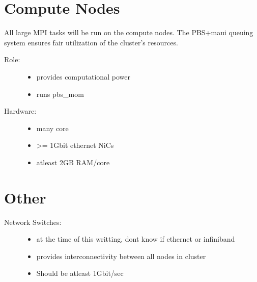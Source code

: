 \documentclass[letterpaper,10pt,english]{sphinxmanual}
\begin{document}
\section{Compute Nodes}
\label{setup:compute-nodes}
All large MPI tasks will be run on the compute nodes.  The PBS+maui queuing
system ensures fair utilization of the cluster's resources.
\begin{description}
\item[{Role:}] \leavevmode\begin{itemize}
\item {} 
provides computational power

\item {} 
runs pbs\_mom

\end{itemize}

\item[{Hardware:}] \leavevmode\begin{itemize}
\item {} 
many core

\item {} 
\textgreater{}= 1Gbit ethernet NiCs

\item {} 
atleast 2GB RAM/core

\end{itemize}

\end{description}


\section{Other}
\label{setup:other}\begin{description}
\item[{Network Switches:}] \leavevmode\begin{itemize}
\item {} 
at the time of this writting, dont know if ethernet or infiniband

\item {} 
provides interconnectivity between all nodes in cluster

\item {} 
Should be atleast 1Gbit/sec

\end{itemize}

\end{description}
\end{document}
